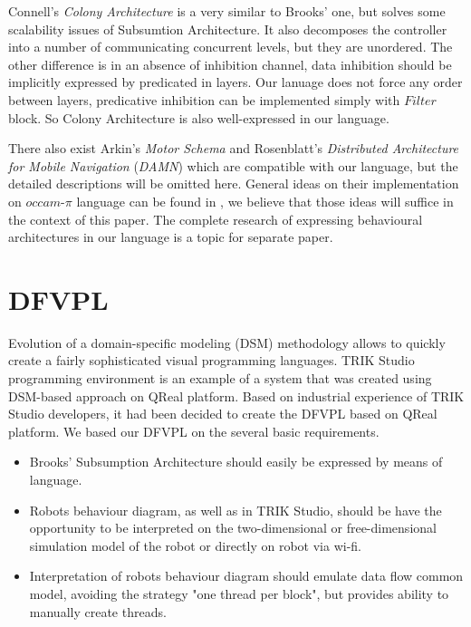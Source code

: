 \documentclass[conference,compsoc]{IEEEtran}
\begin{document}
Connell's \textit{Colony Architecture}\cite{connell1989colony} is a very similar to Brooks' one, but solves some scalability issues of Subsumtion Architecture. It also decomposes the controller into a number of communicating concurrent levels, but they are unordered. The other difference is in an absence of inhibition channel, data inhibition should be implicitly expressed by predicated in layers. Our lanuage does not force any order between layers, predicative inhibition can be implemented simply with $Filter$ block. So Colony Architecture is also well-expressed in our language.

There also exist Arkin’s \textit{Motor Schema}\cite{arkin1987motor} and Rosenblatt’s \textit{Distributed Architecture for Mobile Navigation} (\textit{DAMN})\cite{rosenblatt1997damn} which are compatible with our language, but the detailed descriptions will be omitted here. General ideas on their implementation on $occam\mbox{-}\pi$ language can be found in \cite{simpson2009toward}, we believe that those ideas will suffice in the context of this paper. The complete research of expressing behavioural architectures in our language is a topic for separate paper.

\section{DFVPL}
\label{sec:lang}
Evolution of a domain-specific modeling (DSM) methodology allows to quickly create a fairly sophisticated visual programming languages\cite{DSM}. TRIK Studio programming environment is an example of a system that was created using DSM-based approach on QReal platform\cite{qrealMeta, kuzenkova2013qreal}. Based on industrial experience of TRIK Studio developers, it had been decided to create the DFVPL based on QReal platform. We based our DFVPL on the several basic requirements.

\begin{itemize}
\item Brooks’ Subsumption Architecture should easily be expressed by means of language.
\item Robots behaviour diagram, as well as in TRIK Studio, should be have the opportunity to be interpreted on the two-dimensional or free-dimensional simulation model of the robot or directly on robot via wi-fi.
\item Interpretation  of robots behaviour diagram  should emulate data flow common model, avoiding the strategy "one thread per block", but provides ability to manually create threads.
\end{itemize}
\end{document}
